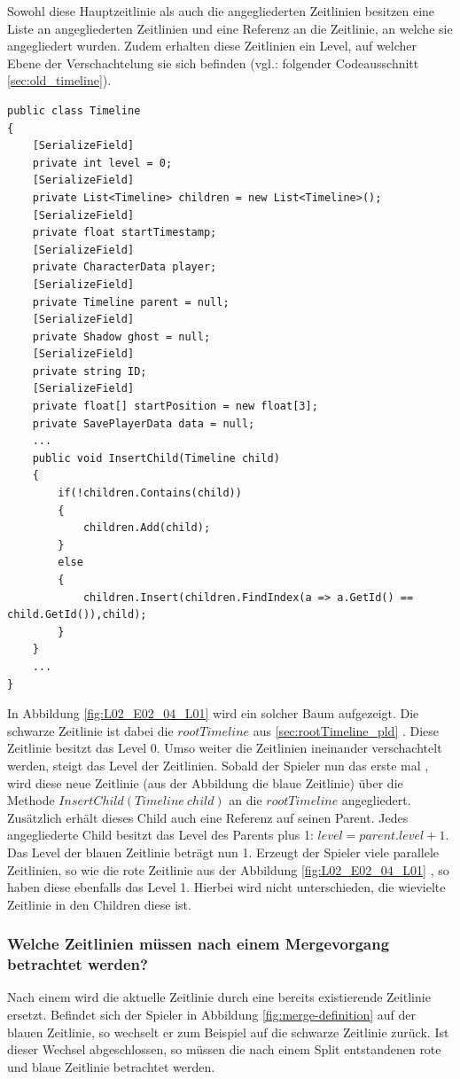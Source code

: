 Sowohl diese Hauptzeitlinie als auch die angegliederten Zeitlinien besitzen eine Liste an angegliederten Zeitlinien und eine Referenz an die Zeitlinie, an welche sie angegliedert wurden. Zudem erhalten diese Zeitlinien ein Level, auf welcher Ebene der Verschachtelung sie sich befinden (vgl.: folgender Codeausschnitt \ref{sec:old_timeline}).

\begin{lstlisting}[caption={Ausschnitt aus Timeline aus dem alten Prototyp}, label={sec:old_timeline}]
public class Timeline
{
    [SerializeField]
    private int level = 0;
    [SerializeField]
    private List<Timeline> children = new List<Timeline>();
    [SerializeField]
    private float startTimestamp;
    [SerializeField]
    private CharacterData player;
    [SerializeField]
    private Timeline parent = null;
    [SerializeField]
    private Shadow ghost = null;
    [SerializeField]
    private string ID;
    [SerializeField]
    private float[] startPosition = new float[3];
    private SavePlayerData data = null;
    ...
    public void InsertChild(Timeline child)
    {
        if(!children.Contains(child))
        {
            children.Add(child);
        }
        else
        {
            children.Insert(children.FindIndex(a => a.GetId() == child.GetId()),child);
        }
    }
    ...
}
\end{lstlisting}

In Abbildung \ref{fig:L02_E02_04_L01}  wird ein solcher Baum aufgezeigt. Die schwarze Zeitlinie ist dabei die $rootTimeline$ aus \ref{sec:rootTimeline_pld} . Diese Zeitlinie besitzt das Level 0. Umso weiter die Zeitlinien ineinander verschachtelt werden, steigt das Level der Zeitlinien. Sobald der Spieler nun das erste mal , wird diese neue Zeitlinie (aus der Abbildung die blaue Zeitlinie) über die Methode $InsertChild(Timeline ~child)$ an die $rootTimeline$ angegliedert. Zusätzlich erhält dieses Child auch eine Referenz auf seinen Parent. Jedes angegliederte Child besitzt das Level des Parents plus 1: $level = parent.level +1$. Das Level der blauen Zeitlinie beträgt nun 1. Erzeugt der Spieler viele parallele  Zeitlinien, so wie die rote Zeitlinie aus der Abbildung \ref{fig:L02_E02_04_L01} , so haben diese ebenfalls das Level 1. Hierbei wird nicht unterschieden, die wievielte Zeitlinie in den Children diese ist. 

\subsubsection{Welche Zeitlinien müssen nach einem Mergevorgang betrachtet werden?}\label{sec:good_02}
Nach einem  wird die aktuelle Zeitlinie durch eine bereits existierende Zeitlinie ersetzt. Befindet sich der Spieler in Abbildung \ref{fig:merge-definition} auf der blauen Zeitlinie, so wechselt er zum Beispiel auf die schwarze Zeitlinie zurück. Ist dieser Wechsel abgeschlossen, so müssen die nach einem Split entstandenen rote und blaue Zeitlinie betrachtet werden.

